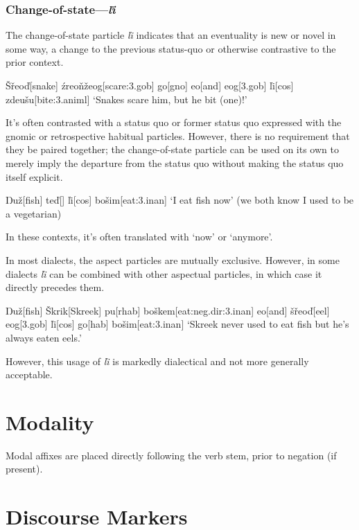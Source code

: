 \documentclass[a4paper,11pt,oneside,openany]{memoir}
\newcommand{\vd}{ď}
\newcommand{\vz}{ž}
\newcommand{\vs}{š}
\newcommand{\vr}{ř}
\newcommand{\vl}{ľ}
\newcommand{\vn}{ň}
\newcommand{\vS}{Š}
\newcommand{\Engma}{Ŋ}
\begin{document}
\subsubsection{Change-of-state---\textit{\vl i}}

The change-of-state particle \textit{\vl i} indicates that an eventuality is new or novel in some way, a change to the previous status-quo or otherwise contrastive to the prior context.

\ex
\begingl
\vS\vr eo\vd[snake]
\'zreo\vn\vz eog[scare:{\sc 3.gob}]
go[\sc gno]
eo[and]
eog[\sc 3.gob]
\vl i[\sc cos]
zdeu\vs u[bite:{\sc 3.animl}]
\glft `Snakes scare him, but he bit (one)!'
\endgl
\xe

It's often contrasted with a status quo or former status quo expressed with the gnomic or retrospective habitual particles. However, there is no requirement that they be paired together; the change-of-state particle can be used on its own to merely imply the departure from the status quo without making the status quo itself explicit.

\ex
\begingl
\Engma u\vz[fish]
te\vd[]
\vl i[\sc cos]
bo\vs im[eat:{\sc 3.inan}]
\glft `I eat fish now' (we both know I used to be a vegetarian)
\endgl
\xe

In these contexts, it's often translated with `now' or `anymore'. 

In most dialects, the aspect particles are mutually exclusive. However, in some dialects \textit{\vl i} can be combined with other aspectual particles, in which case it directly precedes them.

\ex {}
\begingl
\Engma u\vz[fish]
\vS krik[Skreek]
pu[\sc rhab]
bo\vs kem[eat:{\sc neg.dir:3.inan}]
eo[and]
\vs\vr eo\vd[eel]
eog[\sc 3.gob]
\vl i[\sc cos]
go[\sc hab]
bo\vs im[eat:{\sc 3.inan}]
\glft `Skreek never used to eat fish but he's always eaten eels.'
\endgl
\xe

However, this usage of \textit{\vl i} is markedly dialectical and not more generally acceptable.

\section{Modality}

Modal affixes are placed directly following the verb stem, prior to negation (if present).

\section{Discourse Markers}
\end{document}
